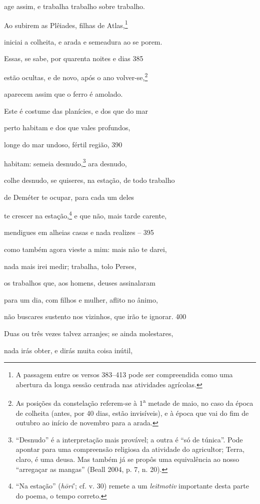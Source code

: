 age assim, e trabalha trabalho sobre trabalho.

Ao subirem as Plêiades, filhas de Atlas,\footnote{A passagem entre os versos 383--413  pode ser compreendida como uma abertura da longa
sessão centrada nas atividades agrícolas.}

iniciai a colheita, e arada e semeadura ao se porem.

Essas, se sabe, por quarenta noites e dias \num{385}

estão ocultas, e de novo, após o ano volver-se,\footnote{As posições da constelação referem-se à 1\textsuperscript{a}
metade de maio, no caso da época de colheita (antes, por 40 dias, estão
invisíveis), e à época que vai do fim de outubro ao início de novembro
para a arada.}

aparecem assim que o ferro é amolado.

Este é costume das planícies, e dos que do mar

perto habitam e dos que vales profundos,

longe do mar undoso, fértil região, \num{390}

habitam: semeia desnudo,\footnote{``Desnudo'' é a interpretação mais provável; a outra é ``só de túnica''. Pode apontar para uma compreensão religiosa da atividade do
agricultor; Terra, claro, é uma deusa. Mas também já se propôs uma
equivalência ao nosso ``arregaçar as mangas'' (Beall 2004, p. 7, n. 20).} ara desnudo,

colhe desnudo, se quiseres, na estação, de todo trabalho

de Deméter te ocupar, para cada um deles

te crescer na estação,\footnote{``Na estação'' (\emph{hōri}'; cf. v. 30) remete a um
\emph{leitmotiv} importante desta parte do poema, o tempo correto.} e que não, mais tarde carente,

mendigues em alheias casas e nada realizes -- \num{395}

como também agora vieste a mim: mais não te darei,

nada mais irei medir; trabalha, tolo Perses,

os trabalhos que, aos homens, deuses assinalaram

para um dia, com filhos e mulher, aflito no ânimo,

não buscares sustento nos vizinhos, que irão te ignorar. \num{400}

Duas ou três vezes talvez arranjes; se ainda molestares,

nada irás obter, e dirás muita coisa inútil,

